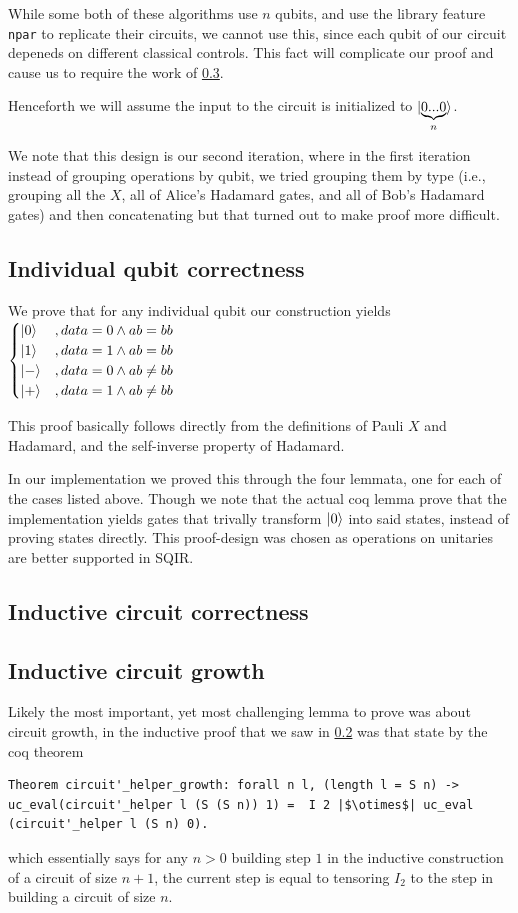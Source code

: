 \documentclass{article}
\begin{document}
While some both of these algorithms use $n$ qubits, and use the library feature \texttt{npar} to replicate their circuits, we cannot use this, since each qubit of our circuit depeneds on different classical controls. This fact will complicate our proof and cause us to require the work of \cref{sec:circuit-growth}.

Henceforth we will assume the input to the circuit is initialized to $\ket{\underbrace{0...0}_n}$.

We note that this design is our second iteration, where in the first iteration instead of grouping operations by qubit, we tried grouping them by type (i.e., grouping all the $X$, all of Alice's Hadamard gates, and all of Bob's Hadamard gates) and then concatenating but that turned out to make proof more difficult.

\subsection{Individual qubit correctness}
We prove that for any individual qubit our construction yields 
$\begin{cases} 
\ket{0}&, data=0 \wedge ab=bb\\
\ket{1}&, data=1 \wedge ab=bb\\
\ket{-}&, data=0 \wedge ab \neq bb\\
\ket{+}&, data=1 \wedge ab \neq bb
\end{cases}
$

This proof basically follows directly from the definitions of Pauli $X$ and Hadamard, and the self-inverse property of Hadamard.

In our implementation we proved this through the four lemmata, one for each of the cases listed above.
Though we note that the actual coq lemma prove that the implementation yields gates that trivally transform $\ket{0}$ into said states, instead of proving states directly. 
This proof-design was chosen as operations on unitaries are better supported in SQIR.
\subsection{Inductive circuit correctness}\label{sec:circuit-correct}


\subsection{Inductive circuit growth}\label{sec:circuit-growth}

Likely the most important, yet most challenging lemma to prove was about circuit growth, in the inductive proof that we saw in \cref{sec:circuit-correct} was that state by the coq theorem
\begin{verbatim}
Theorem circuit'_helper_growth: forall n l, (length l = S n) ->  uc_eval(circuit'_helper l (S (S n)) 1) =  I 2 |$\otimes$| uc_eval (circuit'_helper l (S n) 0).
\end{verbatim}
which essentially says for any $n>0$ building step $1$ in the inductive construction of a circuit of size $n+1$, the current step is equal to tensoring $I_2$ to the  step in building a circuit of size $n$.
\end{document}
